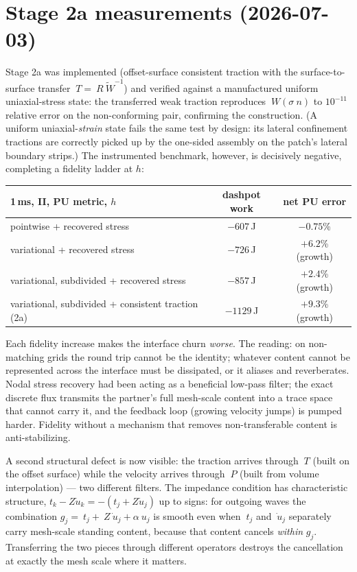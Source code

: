 \documentclass[11pt]{article}
\begin{document}
\section{Stage 2a measurements (2026-07-03)}

Stage 2a was implemented (offset-surface consistent traction with the
surface-to-surface transfer $~T = ~R \tilde{~W}^{-1}$) and verified
against a manufactured uniform uniaxial-stress state: the transferred
weak traction reproduces $~W (\sigma ~n)$ to $10^{-11}$ relative error
on the non-conforming pair, confirming the construction.  (A uniform
uniaxial-\emph{strain} state fails the same test by design: its
lateral confinement tractions are correctly picked up by the one-sided
assembly on the patch's lateral boundary strips.)  The instrumented
benchmark, however, is decisively negative, completing a fidelity
ladder at $h$:

\begin{center}
\small
\begin{tabular}{lcc}
\toprule
1\,ms, II, PU metric, $h$ & dashpot work & net PU error \\
\midrule
pointwise + recovered stress & $-607$\,J & $-0.75$\% \\
variational + recovered stress & $-726$\,J & $+6.2$\% (growth) \\
variational, subdivided + recovered stress & $-857$\,J & $+2.4$\% (growth) \\
variational, subdivided + consistent traction (2a) & $-1129$\,J & $+9.3$\% (growth) \\
\bottomrule
\end{tabular}
\end{center}

Each fidelity increase makes the interface churn \emph{worse}.  The
reading: on non-matching grids the round trip cannot be the identity;
whatever content cannot be represented across the interface must be
dissipated, or it aliases and reverberates.  Nodal stress recovery had
been acting as a beneficial low-pass filter; the exact discrete flux
transmits the partner's full mesh-scale content into a trace space
that cannot carry it, and the feedback loop (growing velocity jumps)
is pumped harder.  Fidelity without a mechanism that removes
non-transferable content is anti-stabilizing.

A second structural defect is now visible: the traction arrives
through $~T$ (built on the offset surface) while the velocity arrives
through $~P$ (built from volume interpolation) --- two different
filters.  The impedance condition has characteristic structure,
$t_k - Z \dot u_k = -(t_j + Z \dot u_j)$ up to signs: for outgoing
waves the combination $g_j = ~t_j + ~Z \dot{~u}_j + \alpha ~u_j$ is
smooth even when $~t_j$ and $\dot{~u}_j$ separately carry mesh-scale
standing content, because that content cancels \emph{within} $g_j$.
Transferring the two pieces through different operators destroys the
cancellation at exactly the mesh scale where it matters.
\end{document}
